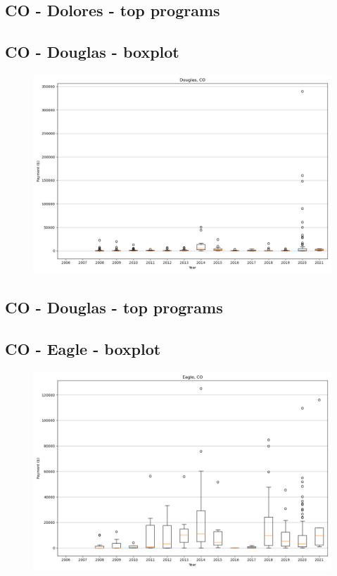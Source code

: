 \subsection*{CO - Dolores - top programs}

\newpage
\subsection*{CO - Douglas - boxplot}
\begin{figure}[h]
\centering
\includegraphics[width=7in]{../output/boxplots/counties/Douglas-CO_boxplot.png}
\end{figure}


\subsection*{CO - Douglas - top programs}

\newpage
\subsection*{CO - Eagle - boxplot}
\begin{figure}[h]
\centering
\includegraphics[width=7in]{../output/boxplots/counties/Eagle-CO_boxplot.png}
\end{figure}


